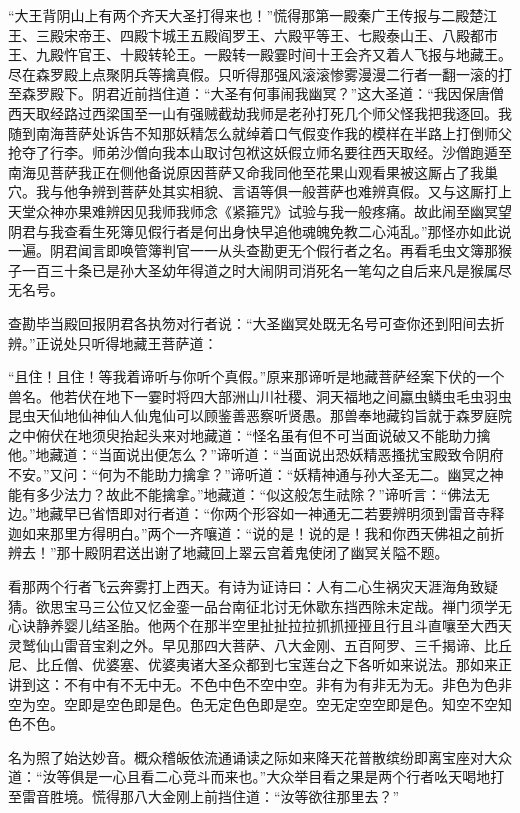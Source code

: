 \documentclass[12pt,UTF8]{ctexbook}
\begin{document}
“大王背阴山上有两个齐天大圣打得来也！”慌得那第一殿秦广王传报与二殿楚江王、三殿宋帝王、四殿卞城王五殿阎罗王、六殿平等王、七殿泰山王、八殿都市王、九殿忤官王、十殿转轮王。一殿转一殿霎时间十王会齐又着人飞报与地藏王。尽在森罗殿上点聚阴兵等擒真假。只听得那强风滚滚惨雾漫漫二行者一翻一滚的打至森罗殿下。阴君近前挡住道：“大圣有何事闹我幽冥？”这大圣道：“我因保唐僧西天取经路过西梁国至一山有强贼截劫我师是老孙打死几个师父怪我把我逐回。我随到南海菩萨处诉告不知那妖精怎么就绰着口气假变作我的模样在半路上打倒师父抢夺了行李。师弟沙僧向我本山取讨包袱这妖假立师名要往西天取经。沙僧跑遁至南海见菩萨我正在侧他备说原因菩萨又命我同他至花果山观看果被这厮占了我巢穴。我与他争辨到菩萨处其实相貌、言语等俱一般菩萨也难辨真假。又与这厮打上天堂众神亦果难辨因见我师我师念《紧箍咒》试验与我一般疼痛。故此闹至幽冥望阴君与我查看生死簿见假行者是何出身快早追他魂魄免教二心沌乱。”那怪亦如此说一遍。阴君闻言即唤管簿判官一一从头查勘更无个假行者之名。再看毛虫文簿那猴子一百三十条已是孙大圣幼年得道之时大闹阴司消死名一笔勾之自后来凡是猴属尽无名号。

查勘毕当殿回报阴君各执笏对行者说：“大圣幽冥处既无名号可查你还到阳间去折辨。”正说处只听得地藏王菩萨道：

“且住！且住！等我着谛听与你听个真假。”原来那谛听是地藏菩萨经案下伏的一个兽名。他若伏在地下一霎时将四大部洲山川社稷、洞天福地之间蠃虫鳞虫毛虫羽虫昆虫天仙地仙神仙人仙鬼仙可以顾鉴善恶察听贤愚。那兽奉地藏钧旨就于森罗庭院之中俯伏在地须臾抬起头来对地藏道：“怪名虽有但不可当面说破又不能助力擒他。”地藏道：“当面说出便怎么？”谛听道：“当面说出恐妖精恶搔扰宝殿致令阴府不安。”又问：“何为不能助力擒拿？”谛听道：“妖精神通与孙大圣无二。幽冥之神能有多少法力？故此不能擒拿。”地藏道：“似这般怎生祛除？”谛听言：“佛法无边。”地藏早已省悟即对行者道：“你两个形容如一神通无二若要辨明须到雷音寺释迦如来那里方得明白。”两个一齐嚷道：“说的是！说的是！我和你西天佛祖之前折辨去！”那十殿阴君送出谢了地藏回上翠云宫着鬼使闭了幽冥关隘不题。

看那两个行者飞云奔雾打上西天。有诗为证诗曰：人有二心生祸灾天涯海角致疑猜。欲思宝马三公位又忆金銮一品台南征北讨无休歇东挡西除未定哉。禅门须学无心诀静养婴儿结圣胎。他两个在那半空里扯扯拉拉抓抓挜挜且行且斗直嚷至大西天灵鹫仙山雷音宝刹之外。早见那四大菩萨、八大金刚、五百阿罗、三千揭谛、比丘尼、比丘僧、优婆塞、优婆夷诸大圣众都到七宝莲台之下各听如来说法。那如来正讲到这：不有中有不无中无。不色中色不空中空。非有为有非无为无。非色为色非空为空。空即是空色即是色。色无定色色即是空。空无定空空即是色。知空不空知色不色。

名为照了始达妙音。概众稽皈依流通诵读之际如来降天花普散缤纷即离宝座对大众道：“汝等俱是一心且看二心竞斗而来也。”大众举目看之果是两个行者吆天喝地打至雷音胜境。慌得那八大金刚上前挡住道：“汝等欲往那里去？”
\end{document}
